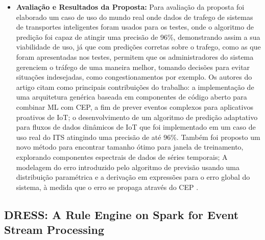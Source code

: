 \documentclass[tid,table]{texufpel} %
\begin{document}
\begin{itemize}
	 \item \textbf{Avaliação e Resultados da Proposta:}
	 Para avaliação da proposta foi elaborado um caso de uso do mundo real onde dados de trafego de sistemas de transportes inteligentes foram usados para os testes, onde o algoritmo de predição foi capaz de atingir uma precisão de 96\%, demonstrando assim a sua viabilidade de uso, já que com predições corretas sobre o trafego, como as que foram apresentadas nos testes, permitem que os administradores do sistema gerenciem o tráfego de uma maneira melhor, tomando decisões para evitar situações indesejadas, como congestionamentos por exemplo.	 
	 Os autores do artigo citam como principais contribuições do trabalho:
	 a implementação de uma arquitetura genérica baseada em componentes de código aberto para combinar ML com CEP, a fim de prever eventos complexos para aplicativos proativos de IoT;
	 o desenvolvimento de um algoritmo de predição adaptativo para fluxos de dados dinâmicos de IoT que foi implementado em um caso de uso real do ITS atingindo uma precisão de até 96\%. Também foi proposto um novo método para encontrar tamanho ótimo para janela de treinamento, explorando componentes espectrais de dados de séries temporais;
	 A modelagem do erro introduzido pelo algoritmo de previsão usando uma distribuição paramétrica e a derivação em expressões para o erro global do sistema, à medida que o erro se propaga através do CEP \cite{art4akbar2017predictive}.
\end{itemize}


\subsection{DRESS: A Rule Engine on Spark for Event Stream Processing}
\end{document}
